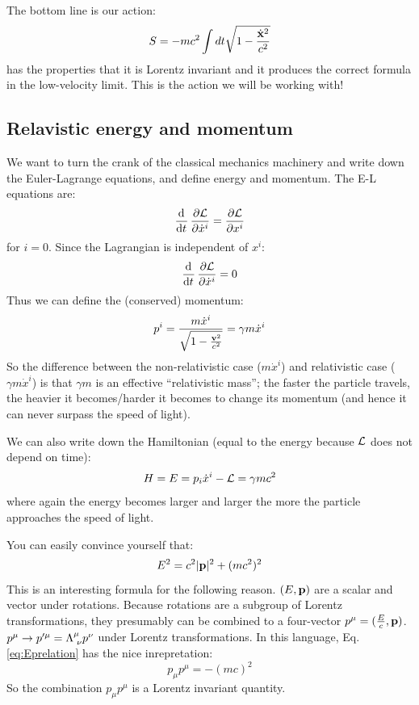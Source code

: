 The bottom line is our action:
\begin{equation}
    S = -mc^2\int dt\sqrt{1 - \frac{\dot{\mathbf{x}}^2}{c^2}}
\end{equation}
has the properties that it is Lorentz invariant and it produces the correct formula in the low-velocity limit. This is the action we will be working with!

\subsection{Relavistic energy and momentum}

We want to turn the crank of the classical mechanics machinery and write down the Euler-Lagrange equations, and define energy and momentum. The E-L equations are:
\begin{equation}
    \dod{}{t}\ddpd{\LL}{\dot{x}^i} = \ddpd{\LL}{x^i}
\end{equation}
for $i = 0$. Since the Lagrangian is independent of $x^i$:
\begin{equation}
    \dod{}{t}\ddpd{\LL}{\dot{x}^i} = 0
\end{equation}
Thus we can define the (conserved) momentum:
\begin{equation}
    p^i = \frac{m\dot{x}^i}{\sqrt{1-\frac{\mathbf{v}^2}{c^2}}} = \gamma m\dot{x}^i
\end{equation}
So the difference between the non-relativistic case ($m\dot{x}^i$) and relativistic case ($\gamma m\dot{x}^i$) is that $\gamma m$ is an effective ``relativistic mass''; the faster the particle travels, the heavier it becomes/harder it becomes to change its momentum (and hence it can never surpass the speed of light).

We can also write down the Hamiltonian (equal to the energy because $\mathcal{L}$ does not depend on time):
\begin{equation}
    H = E = p_i \dot{x}^i - \mathcal{L} = \gamma mc^2
\end{equation}
where again the energy becomes larger and larger the more the particle approaches the speed of light.

You can easily convince yourself that:
\begin{equation}\label{eq:Eprelation}
    E^2 = c^2\lvert \mathbf{p} \rvert^2 + (mc^2)^2
\end{equation}
This is an interesting formula for the following reason. $(E, \mathbf{p})$ are a scalar and vector under rotations. Because rotations are a subgroup of Lorentz transformations, they presumably can be combined to a four-vector $p^\mu = (\frac{E}{c}, \mathbf{p})$. $p^\mu \to p'^\mu = \Lambda^{\mu}_{\sp\nu}p^\nu$ under Lorentz transformations. In this language, Eq. \eqref{eq:Eprelation} has the nice inrepretation:
\begin{equation}
    p_\mu p^\mu = -(mc)^2
\end{equation}
So the combination $p_\mu p^\mu$ is a Lorentz invariant quantity.

